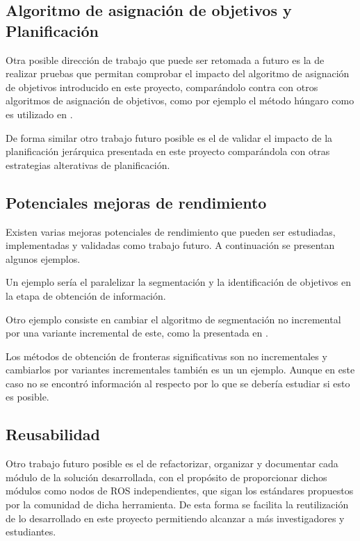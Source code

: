 \subsection[Algoritmo de asignación de objetivos y Planificación]{Algoritmo de asignación de objetivos y\\ Planificación}

Otra posible dirección de trabajo que puede ser retomada a futuro es la de
realizar pruebas que permitan comprobar el impacto del algoritmo de asignación
de objetivos introducido en este proyecto, comparándolo contra con otros algoritmos de
asignación de objetivos, como por ejemplo el método húngaro como es utilizado
en \cite{wurm2008coordinated}.

De forma similar otro trabajo futuro posible es el de validar el impacto de la
planificación jerárquica presentada en este proyecto comparándola con otras
estrategias alterativas de planificación. 

\subsection{Potenciales mejoras de rendimiento}


Existen varias mejoras potenciales de rendimiento que pueden ser estudiadas,
implementadas y validadas como trabajo futuro. A continuación se presentan
algunos ejemplos.

Un ejemplo sería el paralelizar la segmentación y la identificación de
objetivos en la etapa de obtención de información.

Otro ejemplo consiste en cambiar el algoritmo de segmentación no incremental por una variante
incremental de este, como la presentada en \cite{Liu2015}. 

Los métodos de obtención de fronteras significativas son no incrementales y cambiarlos
por variantes incrementales también es un un ejemplo. Aunque en este caso no se
encontró información al respecto por lo que se debería estudiar si esto es
posible.



\subsection{Reusabilidad}

Otro trabajo futuro posible es el de refactorizar, organizar y documentar cada
módulo de la solución desarrollada, con el propósito de proporcionar dichos
módulos como nodos de \gls{ROS} independientes, que sigan los estándares propuestos
por la comunidad de dicha herramienta. De esta forma se facilita la
reutilización de lo desarrollado en este proyecto permitiendo
alcanzar a más investigadores y estudiantes.

